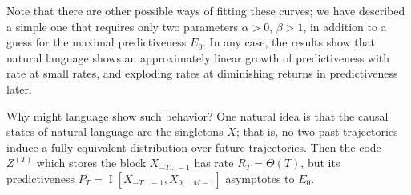 \documentclass[entropy,article,submit,moreauthors,pdftex,10pt,a4paper]{Definitions/mdpi}
\newif \ifcomment
\newcommand\rljf[1]{\ifcomment{{\color{blue}(#1)}}\else{}\fi}
\newcommand{\past}{\overleftarrow{X}}
\let\oldequation\equation
\let\oldendequation\endequation
\renewenvironment{equation}
  {\linenomathNonumbers\oldequation}
  {\oldendequation\endlinenomath}
\begin{document}
Note that there are other possible ways of fitting these curves; we have described a simple one that requires only two parameters $\alpha >0$, $\beta > 1$, in addition to a guess for the maximal predictiveness $E_0$.
In any case, the results show that natural language shows an approximately linear growth of predictiveness with rate at small rates, and exploding rates at diminishing returns in predictiveness later.

Why might language show such behavior?
One natural idea is that the causal states of natural language are the singletons $\past$; that is, no two past trajectories induce a fully equivalent distribution over future trajectories.
Then the code $Z^{(T)}$ which stores the block $X_{-T...-1}$ has rate $R_T = \Theta(T)$, but its predictiveness $P_T =	\operatorname{I}[X_{-T...-1}, X_{0,...M-1}]$ asymptotes to $E_0$.

\end{document}
